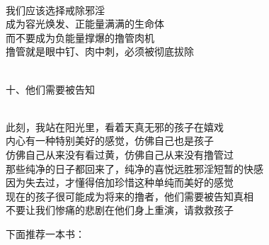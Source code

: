 \begin{poem}
\begin{adjustwidth}{-4em}{-4em}
\begin{multicols}{2}
\begin{center}
                ~\\

                我们应该选择戒除邪淫 \\ 成为容光焕发、正能量满满的生命体 \\ 而不要成为负能量撑爆的撸管肉机 \\ 撸管就是眼中钉、肉中刺，必须被彻底拔除

                ~\\

                十、他们需要被告知

                ~\\

                此刻，我站在阳光里，看着天真无邪的孩子在嬉戏 \\ 内心有一种特别美好的感觉，仿佛自己也是孩子 \\ 仿佛自己从来没有看过黄，仿佛自己从来没有撸管过 \\ 那些纯净的日子都回来了，纯净的喜悦远胜邪淫短暂的快感 \\ 因为失去过，才懂得倍加珍惜这种单纯而美好的感觉 \\ 现在的孩子很可能成为将来的撸者，他们需要被告知真相 \\ 不要让我们惨痛的悲剧在他们身上重演，请救救孩子
            \end{center}
        \end{multicols}
    \end{adjustwidth}
\end{poem}

下面推荐一本书：

